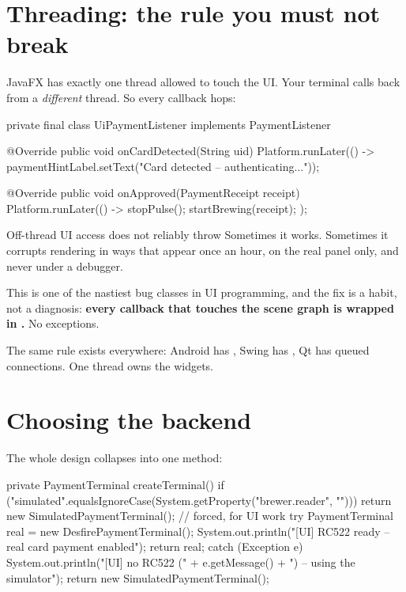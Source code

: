 \section{Threading: the rule you must not break}

JavaFX has exactly one thread allowed to touch the UI. Your terminal calls back
from a \emph{different} thread. So every callback hops:

\begin{jcode}
private final class UiPaymentListener implements PaymentListener {

    @Override
    public void onCardDetected(String uid) {
        Platform.runLater(() ->
            paymentHintLabel.setText("Card detected -- authenticating..."));
    }

    @Override
    public void onApproved(PaymentReceipt receipt) {
        Platform.runLater(() -> { stopPulse(); startBrewing(receipt); });
    }
}
\end{jcode}

\begin{trap}{Off-thread UI access does not reliably throw}
Sometimes it works. Sometimes it corrupts rendering in ways that appear once an
hour, on the real panel only, and never under a debugger.

This is one of the nastiest bug classes in UI programming, and the fix is a
habit, not a diagnosis: \textbf{every callback that touches the scene graph is
wrapped in .} No exceptions.

The same rule exists everywhere: Android has , Swing has
, Qt has queued connections. One thread owns the widgets.
\end{trap}

\section{Choosing the backend}

The whole design collapses into one method:

\begin{jcode}
private PaymentTerminal createTerminal() {
    if ("simulated".equalsIgnoreCase(System.getProperty("brewer.reader", ""))) {
        return new SimulatedPaymentTerminal();          // forced, for UI work
    }
    try {
        PaymentTerminal real = new DesfirePaymentTerminal();
        System.out.println("[UI] RC522 ready -- real card payment enabled");
        return real;
    } catch (Exception e) {
        System.out.println("[UI] no RC522 (" + e.getMessage()
                + ") -- using the simulator");
        return new SimulatedPaymentTerminal();
    }
}
\end{jcode}

